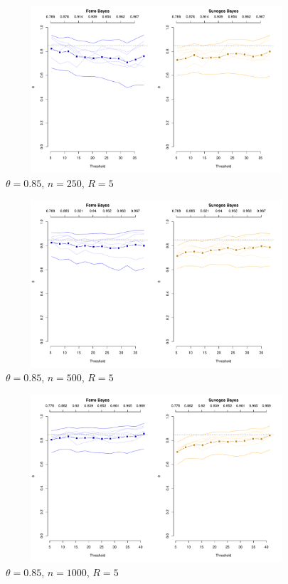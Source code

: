 \documentclass[12pt]{article}
\begin{document}
\newpage

\begin{figure}
\begin{center}
\includegraphics[width=5.5in, height=2.45in]{../extremal_comparison/figs/sim_frechet_hier_85_250_5.pdf}
\caption{$\theta=0.85$, $n=250$, $R=5$}
\end{center}
\end{figure}

\begin{figure}
\begin{center}
\includegraphics[width=5.5in, height=2.45in]{../extremal_comparison/figs/sim_frechet_hier_85_500_5.pdf}
\caption{$\theta=0.85$, $n=500$, $R=5$}
\end{center}
\end{figure}

\begin{figure}
\begin{center}
\includegraphics[width=5.5in, height=2.45in]{../extremal_comparison/figs/sim_frechet_hier_85_1000_5.pdf}
\caption{$\theta=0.85$, $n=1000$, $R=5$}
\end{center}
\end{figure}
\end{document}
